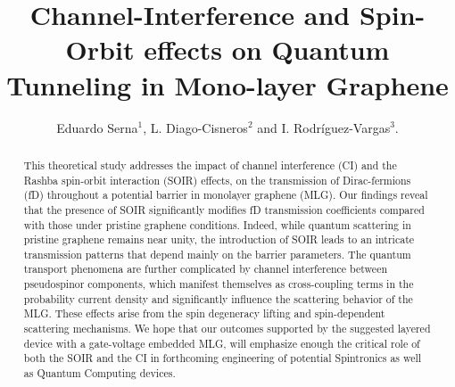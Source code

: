 \documentclass{../assets/templates/iopjournal}
\begin{document}

    \title{Channel-Interference and Spin-Orbit effects on Quantum Tunneling in Mono-layer Graphene}
    
    \author{Eduardo Serna$^1$, L. Diago-Cisneros$^2$ and I. Rodr\'iguez-Vargas$^3$.}
    
       
    
        
    

    \begin{abstract}
        This theoretical study addresses the impact of channel interference (CI) and the Rashba spin-orbit interaction (SOIR) effects, on the transmission of Dirac-fermions (fD) throughout a potential barrier in monolayer graphene (MLG). Our findings reveal that the presence of SOIR significantly modifies fD transmission coefficients compared with those under pristine graphene conditions. Indeed, while quantum scattering in pristine graphene remains near unity, the introduction of SOIR leads to an intricate transmission patterns that depend mainly on the barrier parameters. The quantum transport phenomena are further complicated by channel interference between pseudospinor components, which manifest themselves as cross-coupling terms in the probability current density and significantly influence the scattering behavior of the MLG. These effects arise from the spin degeneracy lifting and spin-dependent scattering mechanisms. We hope that our outcomes supported by the suggested layered device with a gate-voltage embedded MLG, will emphasize enough the critical role of both the SOIR and the CI in forthcoming engineering of potential Spintronics as well as Quantum Computing devices.
    \end{abstract}
\end{document}
